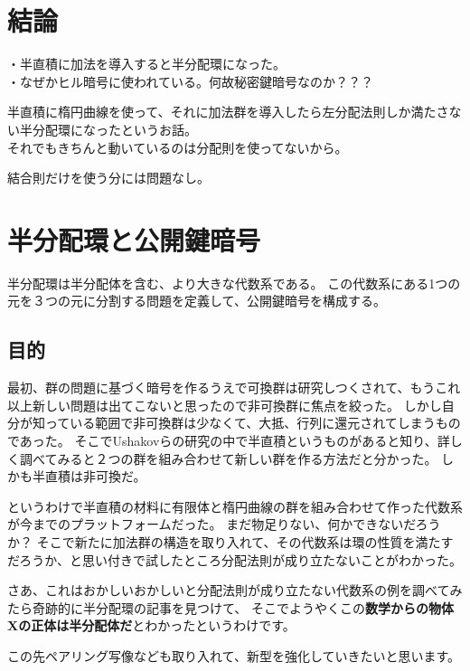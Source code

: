 \documentclass[
]{article}
\begin{document}
\hypertarget{ux7d50ux8ad6}{%
\section{結論}\label{ux7d50ux8ad6}}

・半直積に加法を導入すると半分配環になった。\\
・なぜかヒル暗号に使われている。何故秘密鍵暗号なのか？？？

半直積に楕円曲線を使って、それに加法群を導入したら左分配法則しか満たさない半分配環になったというお話。\\
それでもきちんと動いているのは分配則を使ってないから。

結合則だけを使う分には問題なし。

\hypertarget{ux534aux5206ux914dux74b0ux3068ux516cux958bux9375ux6697ux53f7}{%
\section{半分配環と公開鍵暗号}\label{ux534aux5206ux914dux74b0ux3068ux516cux958bux9375ux6697ux53f7}}

半分配環は半分配体を含む、より大きな代数系である。
この代数系にある1つの元を３つの元に分割する問題を定義して、公開鍵暗号を構成する。

\hypertarget{ux76eeux7684}{%
\subsection{目的}\label{ux76eeux7684}}

最初、群の問題に基づく暗号を作るうえで可換群は研究しつくされて、もうこれ以上新しい問題は出てこないと思ったので非可換群に焦点を絞った。
しかし自分が知っている範囲で非可換群は少なくて、大抵、行列に還元されてしまうものであった。
そこでUshakovらの研究の中で半直積というものがあると知り、詳しく調べてみると２つの群を組み合わせて新しい群を作る方法だと分かった。
しかも半直積は非可換だ。

というわけで半直積の材料に有限体と楕円曲線の群を組み合わせて作った代数系が今までのプラットフォームだった。
まだ物足りない、何かできないだろうか？
そこで新たに加法群の構造を取り入れて、その代数系は環の性質を満たすだろうか、と思い付きで試したところ分配法則が成り立たないことがわかった。

さあ、これはおかしいおかしいと分配法則が成り立たない代数系の例を調べてみたら奇跡的に半分配環の記事を見つけて、
そこでようやくこの\textbf{数学からの物体Xの正体は半分配体だ}とわかったというわけです。

この先ペアリング写像なども取り入れて、新型を強化していきたいと思います。
\end{document}
